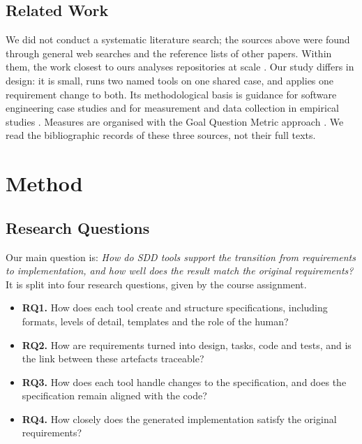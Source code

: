 \documentclass[conference]{IEEEtran}
\providecommand{\tightlist}{\setlength{\itemsep}{0pt}\setlength{\parskip}{0pt}}
\begin{document}
\subsection{Related Work}\label{related-work}

We did not conduct a systematic literature search; the sources above
were found through general web searches and the reference lists of other
papers. Within them, the work closest to ours analyses repositories at
scale \cite{claudino2026, agarwal2026, hill2026}. Our study differs in
design: it is small, runs two named tools on one shared case, and
applies one requirement change to both. Its methodological basis is
guidance for software engineering case studies \cite{runeson2009} and
for measurement and data collection in empirical studies
\cite{kitchenham2002}. Measures are organised with the Goal Question
Metric approach \cite{basili1994}. We read the bibliographic records of
these three sources, not their full texts.

\section{Method}\label{method}

\subsection{Research Questions}\label{research-questions}

Our main question is: \emph{How do SDD tools support the transition from
requirements to implementation, and how well does the result match the
original requirements?} It is split into four research questions, given
by the course assignment.

\begin{itemize}
\tightlist
\item
  \textbf{RQ1.} How does each tool create and structure specifications,
  including formats, levels of detail, templates and the role of the
  human?
\item
  \textbf{RQ2.} How are requirements turned into design, tasks, code and
  tests, and is the link between these artefacts traceable?
\item
  \textbf{RQ3.} How does each tool handle changes to the specification,
  and does the specification remain aligned with the code?
\item
  \textbf{RQ4.} How closely does the generated implementation satisfy
  the original requirements?
\end{itemize}
\end{document}
